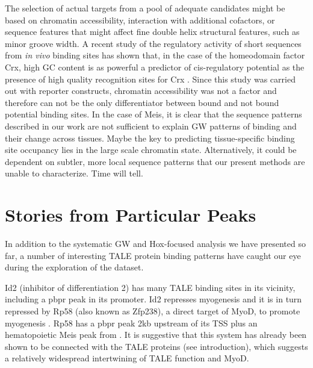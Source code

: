 The selection of actual targets from a pool of adequate candidates might be based on chromatin accessibility, interaction with additional cofactors, or sequence features that might affect fine double helix structural features, such as minor groove width. A recent study of the regulatory activity of short sequences from \textit{in vivo} binding sites has shown that, in the case of the homeodomain factor Crx, high GC content is as powerful a predictor of cis-regulatory potential as the presence of high quality recognition sites for Crx \parencite{White2013}. Since this study was carried out with reporter constructs, chromatin accessibility was not a factor and therefore can not be the only differentiator between bound and not bound potential binding sites. In the case of Meis, it is clear that the sequence patterns described in our work are not sufficient to explain \ac{GW} patterns of binding and their change across tissues. Maybe the key to predicting tissue-specific binding site occupancy lies in the large scale chromatin state. Alternatively, it could be dependent on subtler, more local sequence patterns that our present methods are unable to characterize. Time will tell.

\section{Stories from Particular Peaks}


In addition to the systematic \ac{GW} and Hox-focused analysis we have presented so far, a number of interesting \ac{TALE} protein binding patterns have caught our eye during the exploration of the dataset.

Id2 (inhibitor of differentiation 2) has many \ac{TALE} binding sites in its vicinity, including a \ac{pbpr} peak in its promoter. Id2 represses myogenesis and it is in turn repressed by Rp58 (also known as Zfp238), a direct target of MyoD, to promote myogenesis \parencite{Yokoyama2009}. Rp58 has a \ac{pbpr} peak 2kb upstream of its TSS plus an hematopoietic Meis peak from \textcite{Wilson2010}. It is suggestive that this system has already been shown to be connected with the \ac{TALE} proteins (see introduction), which suggests a relatively widespread intertwining of \ac{TALE} function and MyoD. 

